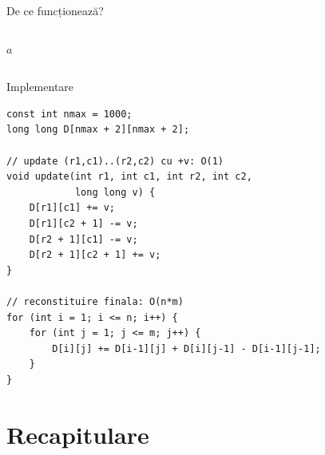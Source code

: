 ﻿\documentclass{beamer}
\begin{document}
\begin{frame}[shrink]{De ce funcționează?}
\begin{columns}[T]
\begin{center}
    \smallskip

    {\footnotesize $a$}
    \end{center}

  \end{columns}
\end{frame}

\begin{frame}{Implementare}
  \begin{lstlisting}
const int nmax = 1000;
long long D[nmax + 2][nmax + 2];

// update (r1,c1)..(r2,c2) cu +v: O(1)
void update(int r1, int c1, int r2, int c2,
            long long v) {
    D[r1][c1] += v;
    D[r1][c2 + 1] -= v;
    D[r2 + 1][c1] -= v;
    D[r2 + 1][c2 + 1] += v;
}

// reconstituire finala: O(n*m)
for (int i = 1; i <= n; i++) {
    for (int j = 1; j <= m; j++) {
        D[i][j] += D[i-1][j] + D[i][j-1] - D[i-1][j-1];
    }
}
  \end{lstlisting}
\end{frame}

\section{Recapitulare}
\end{document}
